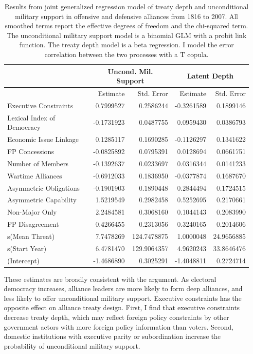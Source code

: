 \documentclass[12pt]{article}
\begin{document}
\begin{table}[ht]
\centering
\begin{tabular}{lrrrr}
  & \multicolumn{2}{c}{Uncond. Mil. Support} & \multicolumn{2}{c}{Latent Depth}\\ \hline
  & Estimate & Std. Error & Estimate & Std. Error \\ 
  \hline
  Executive Constraints & 0.7999527 & 0.2586244 & -0.3261589 & 0.1899146 \\ 
  Lexical Index of Democracy & -0.1731923 & 0.0487755 & 0.0959430 & 0.0386793 \\ 
  Economic Issue Linkage & 0.1285117 & 0.1690285 & -0.1126297 & 0.1341622 \\ 
  FP Concessions & -0.0825892 & 0.0795391 & 0.0128694 & 0.0661751 \\ 
  Number of Members & -0.1392637 & 0.0233697 & 0.0316344 & 0.0141233 \\ 
  Wartime Alliances & -0.6912033 & 0.1836950 & -0.0377874 & 0.1687670 \\ 
  Asymmetric Obligations & -0.1901903 & 0.1890448 & 0.2844494 & 0.1724515 \\ 
  Asymmetric Capability & 1.5219549 & 0.2982458 & 0.5252695 & 0.2170661 \\ 
  Non-Major Only & 2.2484581 & 0.3068160 & 0.1044143 & 0.2083990 \\ 
  FP Disagreement & 0.4266455 & 0.2313056 & 0.3240165 & 0.2014606 \\ 
  s(Mean Threat) & 7.7478269 & 124.7478875 & 1.0000048 & 24.9656885 \\ 
  s(Start Year) & 6.4781470 & 129.9064357 & 4.9620243 & 33.8646476 \\ 
  (Intercept) & -1.4686890 & 0.3025291 & -1.4048811 & 0.2724714 \\ 
   \hline
\end{tabular}
\caption{Results from joint generalized regression model of treaty depth and unconditional military support in 
         offensive and defensive alliances from 1816 to 2007. 
                     All smoothed terms report the effective degrees of freedom and the chi-squared term. 
                     The unconditional military support model is a binomial GLM with a probit link function. 
                     The treaty depth model is a beta regression. 
                     I model the error correlation between the two processes with a T copula.} 
\label{tab:gjrm-res}
\end{table}


These estimates are broadly consistent with the argument. 
As electoral democracy increases, alliance leaders are more likely to form deep alliances, and less likely to offer unconditional military support. 
Executive constraints has the opposite effect on alliance treaty design.
First, I find that executive constraints decrease treaty depth, which may reflect foreign policy constraints by other government actors with more foreign policy information than voters.
Second, domestic institutions with executive parity or subordination increase the probability of unconditional military support. 
\end{document}
